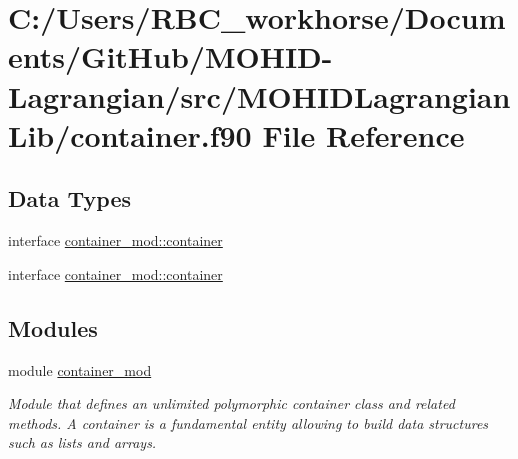 \hypertarget{container_8f90}{}\section{C\+:/\+Users/\+R\+B\+C\+\_\+workhorse/\+Documents/\+Git\+Hub/\+M\+O\+H\+I\+D-\/\+Lagrangian/src/\+M\+O\+H\+I\+D\+Lagrangian\+Lib/container.f90 File Reference}
\label{container_8f90}
\subsection*{Data Types}
\begin{DoxyCompactItemize}
\item 
interface \mbox{\hyperlink{structcontainer__mod_1_1container}{container\+\_\+mod\+::container}}
\item 
interface \mbox{\hyperlink{structcontainer__mod_1_1container}{container\+\_\+mod\+::container}}
\end{DoxyCompactItemize}
\subsection*{Modules}
\begin{DoxyCompactItemize}
\item 
module \mbox{\hyperlink{namespacecontainer__mod}{container\+\_\+mod}}
\begin{DoxyCompactList}\small\item\em Module that defines an unlimited polymorphic container class and related methods. A container is a fundamental entity allowing to build data structures such as lists and arrays. \end{DoxyCompactList}\end{DoxyCompactItemize}
